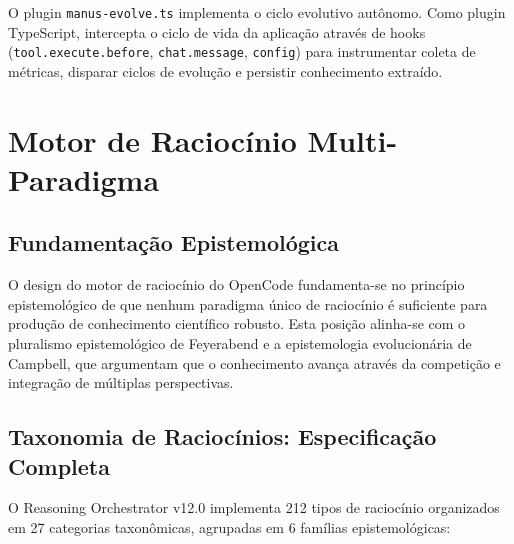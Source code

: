 \documentclass[12pt,a4paper,sumario=tradicional]{abntex2}
\begin{document}
O plugin \texttt{manus-evolve.ts} implementa o ciclo evolutivo autônomo. Como plugin TypeScript, intercepta o ciclo de vida da aplicação através de hooks (\texttt{tool.execute.before}, \texttt{chat.message}, \texttt{config}) para instrumentar coleta de métricas, disparar ciclos de evolução e persistir conhecimento extraído.

\chapter{Motor de Raciocínio Multi-Paradigma}

\section{Fundamentação Epistemológica}

O design do motor de raciocínio do OpenCode fundamenta-se no princípio epistemológico de que nenhum paradigma único de raciocínio é suficiente para produção de conhecimento científico robusto. Esta posição alinha-se com o pluralismo epistemológico de Feyerabend e a epistemologia evolucionária de Campbell, que argumentam que o conhecimento avança através da competição e integração de múltiplas perspectivas.

\section{Taxonomia de Raciocínios: Especificação Completa}

O Reasoning Orchestrator v12.0 implementa 212 tipos de raciocínio organizados em 27 categorias taxonômicas, agrupadas em 6 famílias epistemológicas:
\end{document}
